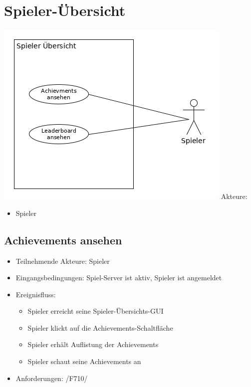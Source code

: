 \documentclass[a4paper]{scrreprt}
\begin{document}
    \section{Spieler-Übersicht}
    \includegraphics[width=\textwidth]{uml/export/Spieler_Ubersicht.png}
    Akteure: 
    \begin{itemize}
    \item \Gls{Spieler}
    \end{itemize}

    \subsection{Achievements ansehen}
    \begin{itemize}
        \item Teilnehmende Akteure: \Gls{Spieler}
        \item Eingangsbedingungen: \Gls{Spiel-Server} ist aktiv, \Gls{Spieler} ist angemeldet
        \item Ereignisfluss:
        \begin{itemize}
            \item \Gls{Spieler} erreicht seine Spieler-Übersichts-GUI
            \item \Gls{Spieler} klickt auf die Achievements-Schaltfläche %
            \item \Gls{Spieler} erhält Auflistung der Achievements
            \item \Gls{Spieler} schaut seine Achievements an
        \end{itemize}
        \item Anforderungen: /F710/
    \end{itemize}
\end{document}
